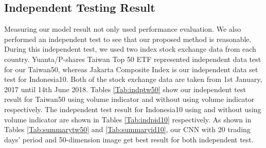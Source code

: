 \documentclass[10pt,twocolumn]{article}
\begin{document}
\subsection{Independent Testing Result}
Measuring our model result not only used performance evaluation. We also performed an independent test to see that our proposed method is reasonable. During this independent test, we used two index stock exchange data from each country. Yuanta/P-shares Taiwan Top 50 ETF represented independent data test for our Taiwan50, whereas Jakarta Composite Index is our independent data set test for Indonesia10. Both of the stock exchange data are taken from 1st January, 2017 until 14th June 2018. 
Tables \ref{Tab:indptw50} show our independent test result for Taiwan50 using volume indicator and without using volume indicator respectively. The independent test result for Indonesia10 using and without using volume indicator are shown in Tables \ref{Tab:indpid10} respectively. As shown in Tables \ref{Tab:summarytw50} and \ref{Tab:summaryid10}, our CNN with 20 trading days’ period and 50-dimension image get best result for both independent test.
 \begin{table}[H]
 \centering
 \caption{Summary result of Taiwan 50 with their best classifier for each trading days and image dimension.}
 \label{Tab:indptw50}
 \end{table}
 
\end{document}

